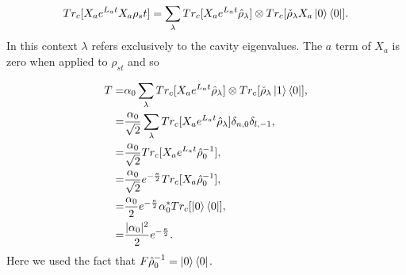 \documentclass[reprint, amsmath,amssymb, aps,pra]{revtex4-1}
\begin{document}
\begin{equation}
Tr_c[X_ae^{L_at}X_a\rho_st] = \sum_\lambda Tr_c[X_ae^{L_at}\hat{\rho}_\lambda] \otimes Tr_c[\check{\rho}_\lambda X_a\Ket{0}\Bra{0}].
\end{equation} In this context $\lambda$ refers exclusively to the cavity eigenvalues. The $a$ term of $X_a$ is zero when applied to $\rho_{st}$ and so 

\begin{align}
T=& \alpha_0\sum_\lambda Tr_c[X_ae^{L_at}\hat{\rho}_\lambda] \otimes Tr_c[\check{\rho}_\lambda\Ket{1}\Bra{0}],\\
=&\frac{\alpha_0}{\sqrt{2}}\sum_\lambda Tr_c[X_ae^{L_at}\hat{\rho}_\lambda] \delta_{n,0}\delta_{l,-1},\\
=&\frac{\alpha_0}{\sqrt{2}} Tr_c[X_ae^{L_at}\hat{\rho}_0^{-1}],\\
=&\frac{\alpha_0}{\sqrt{2}}e^{-\frac{\kappa}{2}} Tr_c[X_a\hat{\rho}_0^{-1}],\\
=&\frac{\alpha_0}{2}e^{-\frac{\kappa}{2}}\alpha_0^*Tr_c[\Ket{0}\Bra{0}],\\
=&\frac{|\alpha_0|^2}{2}e^{-\frac{\kappa}{2}}.
\end{align} Here we used the fact that $F\hat{\rho}_0^{-1}=\Ket{0}\Bra{0}$. 









\end{document}
